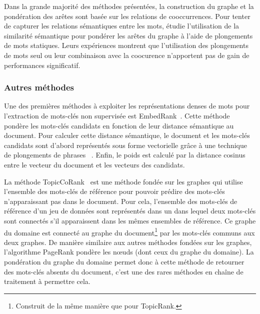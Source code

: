 Dans la grande majorité des méthodes présentées, la construction du graphe et la pondération des arêtes sont basée sur les relations de cooccurrences. Pour tenter de capturer les relations sémantiques entre les mots,  \citet{mothe_automatic_2018} étudie l'utilisation de la similarité sémantique pour pondérer les arêtes du graphe à l'aide de plongements de mots statiques.
Leurs expériences montrent que l'utilisation des plongements de mots seul ou leur combinaison avec la coocurence n'apportent pas de gain de performances significatif.


\subsubsection{Autres méthodes}

Une des premières méthodes à exploiter les représentations denses de mots pour l'extraction de mots-clés non supervisée est  EmbedRank~\cite{bennani-smires_simple_2018}.
Cette méthode pondère les mots-clés candidats en fonction de leur distance sémantique au document.
Pour calculer cette distance sémantique, le document et les mots-clés candidats sont d'abord représentés sous forme vectorielle grâce à une technique de plongements de phrases ~\cite{pagliardini_unsupervised_2018}. Enfin, le poids est calculé par la distance cosinus entre le vecteur du document et les vecteurs des candidats.


La méthode TopicCoRank~\cite{bougouin_indexation_2015} est une méthode fondée sur les graphes qui utilise l'ensemble des mots-clés de référence pour pouvoir prédire des mots-clés n'apparaissant pas dans le document.
Pour cela, l'ensemble des mots-clés de référence d'un jeu de données sont représentés dans un  dans lequel deux mots-clés sont connectés s'il apparaissent dans les mêmes ensembles de référence.
Ce graphe du domaine est connecté au graphe du document\footnote{Construit de la même manière que pour TopicRank.} par les mots-clés communs aux deux graphes.
De manière similaire aux autres méthodes fondées sur les graphes, l'algorithme PageRank pondère les n\oe{}uds (dont ceux du graphe du domaine).
La pondération du graphe du domaine permet donc à cette méthode de retourner des mots-clés absents du document, c'est une des rares méthodes en chaîne de traitement à permettre cela.


